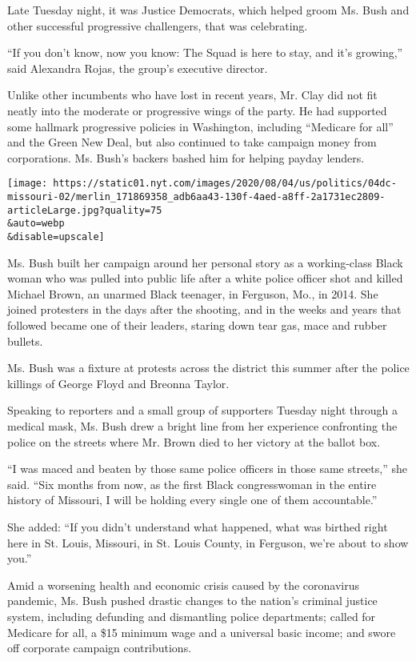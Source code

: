 Late Tuesday night, it was Justice Democrats, which helped groom Ms.
Bush and other successful progressive challengers, that was celebrating.

``If you don't know, now you know: The Squad is here to stay, and it's
growing,'' said Alexandra Rojas, the group's executive director.

Unlike other incumbents who have lost in recent years, Mr. Clay did not
fit neatly into the moderate or progressive wings of the party. He had
supported some hallmark progressive policies in Washington, including
``Medicare for all'' and the Green New Deal, but also continued to take
campaign money from corporations. Ms. Bush's backers bashed him for
helping payday lenders.

\texttt{[image: https://static01.nyt.com/images/2020/08/04/us/politics/04dc-missouri-02/merlin\_171869358\_adb6aa43-130f-4aed-a8ff-2a1731ec2809-articleLarge.jpg?quality=75\\\&auto=webp\\\&disable=upscale]}

Ms. Bush built her campaign around her personal story as a working-class
Black woman who was pulled into public life after a white police officer
shot and killed Michael Brown, an unarmed Black teenager, in Ferguson,
Mo., in 2014. She joined protesters in the days after the shooting, and
in the weeks and years that followed became one of their leaders,
staring down tear gas, mace and rubber bullets.

Ms. Bush was a fixture at protests across the district this summer after
the police killings of George Floyd and Breonna Taylor.

Speaking to reporters and a small group of supporters Tuesday night
through a medical mask, Ms. Bush drew a bright line from her experience
confronting the police on the streets where Mr. Brown died to her
victory at the ballot box.

``I was maced and beaten by those same police officers in those same
streets,'' she said. ``Six months from now, as the first Black
congresswoman in the entire history of Missouri, I will be holding every
single one of them accountable.''

She added: ``If you didn't understand what happened, what was birthed
right here in St. Louis, Missouri, in St. Louis County, in Ferguson,
we're about to show you.''

Amid a worsening health and economic crisis caused by the coronavirus
pandemic, Ms. Bush pushed drastic changes to the nation's criminal
justice system, including defunding and dismantling police departments;
called for Medicare for all, a \$15 minimum wage and a universal basic
income; and swore off corporate campaign contributions.

